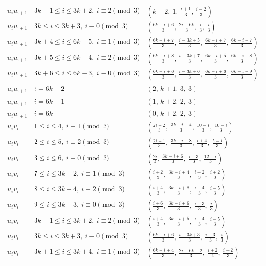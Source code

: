 \begin{longtable}{lll}
$u_i u_{i+1}$ & $3k-1 \le i \le 3k+2,\ i \equiv 2 \pmod{3}$ & $(k+2,\ 1,\ \frac{i+1}{3},\ \frac{i-2}{3})$ \\
$u_i u_{i+1}$ & $3k \le i \le 3k+3,\ i \equiv 0 \pmod{3}$ & $(\frac{6k-i+6}{3},\ \frac{2i-6k}{3},\ \frac{i}{3},\ \frac{i}{3})$ \\
$u_i u_{i+1}$ & $3k+4 \le i \le 6k-5,\ i \equiv 1 \pmod{3}$ & $(\frac{6k-i+7}{3},\ \frac{i-3k+5}{3},\ \frac{6k-i+7}{3},\ \frac{6k-i+7}{3})$ \\
$u_i u_{i+1}$ & $3k+5 \le i \le 6k-4,\ i \equiv 2 \pmod{3}$ & $(\frac{6k-i+8}{3},\ \frac{i-3k+7}{3},\ \frac{6k-i+5}{3},\ \frac{6k-i+8}{3})$ \\
$u_i u_{i+1}$ & $3k+6 \le i \le 6k-3,\ i \equiv 0 \pmod{3}$ & $(\frac{6k-i+6}{3},\ \frac{i-3k+6}{3},\ \frac{6k-i+6}{3},\ \frac{6k-i+9}{3})$ \\
$u_i u_{i+1}$ & $i = 6k-2$ & $(2,\ k+1,\ 3,\ 3)$ \\
$u_i u_{i+1}$ & $i = 6k-1$ & $(1,\ k+2,\ 2,\ 3)$ \\
$u_i u_{i+1}$ & $i = 6k$ & $(0,\ k+2,\ 2,\ 3)$ \\
$u_i v_i$ & $1 \le i \le 4,\ i \equiv 1 \pmod{3}$ & $(\frac{2i-2}{3},\ \frac{3k-i+4}{3},\ \frac{10-i}{3},\ \frac{10-i}{3})$ \\
$u_i v_i$ & $2 \le i \le 5,\ i \equiv 2 \pmod{3}$ & $(\frac{2i-1}{3},\ \frac{3k-i+8}{3},\ \frac{i+4}{3},\ \frac{5-i}{3})$ \\
$u_i v_i$ & $3 \le i \le 6,\ i \equiv 0 \pmod{3}$ & $(\frac{2i}{3},\ \frac{3k-i+6}{3},\ \frac{i-3}{3},\ \frac{12-i}{3})$ \\
$u_i v_i$ & $7 \le i \le 3k-2,\ i \equiv 1 \pmod{3}$ & $(\frac{i+2}{3},\ \frac{3k-i+4}{3},\ \frac{i+2}{3},\ \frac{i+2}{3})$ \\
$u_i v_i$ & $8 \le i \le 3k-4,\ i \equiv 2 \pmod{3}$ & $(\frac{i+4}{3},\ \frac{3k-i+8}{3},\ \frac{i+4}{3},\ \frac{i-5}{3})$ \\
$u_i v_i$ & $9 \le i \le 3k-3,\ i \equiv 0 \pmod{3}$ & $(\frac{i+6}{3},\ \frac{3k-i+6}{3},\ \frac{i-3}{3},\ \frac{i}{3})$ \\
$u_i v_i$ & $3k-1 \le i \le 3k+2,\ i \equiv 2 \pmod{3}$ & $(\frac{i+4}{3},\ \frac{3k-i+5}{3},\ \frac{i+4}{3},\ \frac{i-5}{3})$ \\
$u_i v_i$ & $3k \le i \le 3k+3,\ i \equiv 0 \pmod{3}$ & $(\frac{6k-i+6}{3},\ \frac{i-3k+3}{3},\ \frac{i-3}{3},\ \frac{i}{3})$ \\
$u_i v_i$ & $3k+1 \le i \le 3k+4,\ i \equiv 1 \pmod{3}$ & $(\frac{6k-i+4}{3},\ \frac{2i-6k-2}{3},\ \frac{i+2}{3},\ \frac{i+2}{3})$ \\

\end{longtable}
